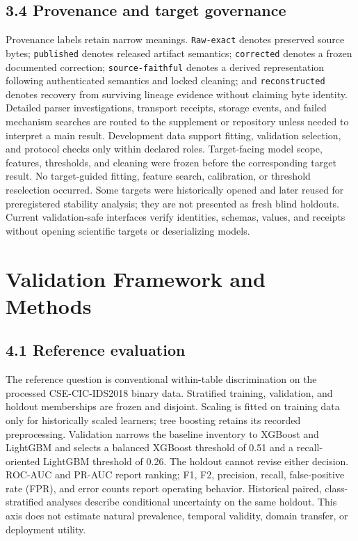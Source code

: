 \documentclass[preprint,12pt]{elsarticle}
\begin{document}
\subsection{3.4 Provenance and target governance}
Provenance labels retain narrow meanings. \texttt{Raw-exact} denotes preserved source bytes; \texttt{published} denotes released artifact semantics; \texttt{corrected} denotes a frozen documented correction; \texttt{source-faithful} denotes a derived representation following authenticated semantics and locked cleaning; and \texttt{reconstructed} denotes recovery from surviving lineage evidence without claiming byte identity. Detailed parser investigations, transport receipts, storage events, and failed mechanism searches are routed to the supplement or repository unless needed to interpret a main result.
Development data support fitting, validation selection, and protocol checks only within declared roles. Target-facing model scope, features, thresholds, and cleaning were frozen before the corresponding target result. No target-guided fitting, feature search, calibration, or threshold reselection occurred. Some targets were historically opened and later reused for preregistered stability analysis; they are not presented as fresh blind holdouts. Current validation-safe interfaces verify identities, schemas, values, and receipts without opening scientific targets or deserializing models.

\section{Validation Framework and Methods}

\subsection{4.1 Reference evaluation}
The reference question is conventional within-table discrimination on the processed CSE-CIC-IDS2018 binary data. Stratified training, validation, and holdout memberships are frozen and disjoint. Scaling is fitted on training data only for historically scaled learners; tree boosting retains its recorded preprocessing. Validation narrows the baseline inventory to XGBoost and LightGBM and selects a balanced XGBoost threshold of 0.51 and a recall-oriented LightGBM threshold of 0.26. The holdout cannot revise either decision. ROC-AUC and PR-AUC report ranking; F1, F2, precision, recall, false-positive rate (FPR), and error counts report operating behavior. Historical paired, class-stratified analyses describe conditional uncertainty on the same holdout. This axis does not estimate natural prevalence, temporal validity, domain transfer, or deployment utility.
\end{document}
